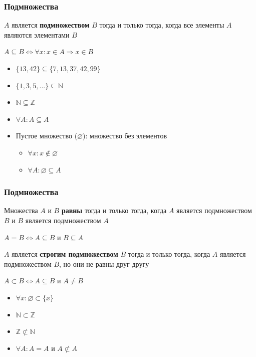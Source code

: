 \documentclass{beamer}
\begin{document}
\begin{frame}[fragile]
  \transwipe[direction=90]
  \frametitle{Подмножества}
  $A$ является \textbf{подмножеством} $B$ тогда и только тогда, когда все элементы $A$ являются элементами $B$
  
  \begin{center}
     $ A \subseteq B \iff \forall x : x \in A \Rightarrow x \in B $   
  \end{center} 
  
  \pause 
  \begin{itemize}
    \item $\{ 13, 42 \} \subseteq \{ 7, 13, 37, 42, 99 \}$
    \item $\{ 1, 3, 5, ...\} \subseteq \mathbb{N} $
    \item $\mathbb{N} \subseteq \mathbb{Z}$
    \item $\forall A : A \subseteq A$
  \end{itemize}
  \begin{itemize}
    \item Пустое множество ($\varnothing$): множество без элементов
    \begin{itemize}
      \item $\forall x : x \notin \varnothing$
      \item $\forall A : \varnothing \subseteq A$
    \end{itemize}
  \end{itemize}
\end{frame}

\begin{frame}[fragile]
  \transwipe[direction=90]
  \frametitle{Подмножества}
  Множества $A$ и $B$ \textbf{равны} тогда и только тогда, когда $A$ является подмножеством $B$ и $B$ является подмножеством $A$  
  
  \begin{center}
    $ A = B \iff A \subseteq B $ и $ B \subseteq A$
  \end{center}
  \pause
  $A$ является \textbf{строгим подмножеством} $B$ тогда и только тогда, когда $A$ является подмножеством $B$, но они не равны друг другу
  
  \begin{center}
     $ A \subset B \iff A \subseteq B $ и $ A \neq B $   
  \end{center} 
  
  \pause 
  \begin{itemize}
     \item $\forall x : \varnothing \subset \{ x \}$
     \item $\mathbb{N} \subset \mathbb{Z}$
     \item $\mathbb{Z} \not\subset \mathbb{N}$
     \item $\forall A: A = A $ и $ A \not\subset A $

  \end{itemize}
\end{frame}
\end{document}

